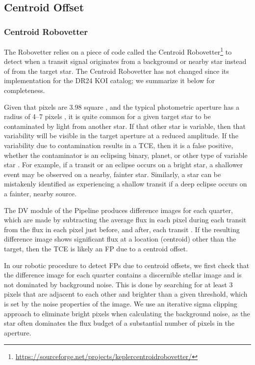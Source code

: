 \subsection{Centroid Offset}
\label{s:centroids}
\subsubsection{Centroid Robovetter}
\label{s:centroidrv}
The Robovetter relies on a piece of code called the Centroid Robovetter\footnote{\url{https://sourceforge.net/projects/keplercentroidrobovetter/}} \citep{Mullally2017} to detect when a transit signal originates from a background or nearby star instead of from the target star. The Centroid Robovetter has not changed since its implementation for the DR24 KOI catalog; we summarize it below for completeness. 

Given that  pixels are 3.98\arcsec{} square \citep{Koch2010}, and the typical photometric aperture has a radius of 4--7 pixels \citep{Bryson2010b}, it is quite common for a given target star to be contaminated by light from another star. If that other star is variable, then that variability will be visible in the target aperture at a reduced amplitude. If the variability due to contamination results in a TCE, then it is a false positive, whether the contaminator is an eclipsing binary, planet, or other type of variable star \citep{Bryson2013}. For example, if a transit or an eclipse occurs on a bright star, a shallower event may be observed on a nearby, fainter star. Similarly, a star can be mistakenly identified as experiencing a shallow transit if a deep eclipse occurs on a fainter, nearby source.

The DV module of the \kepler{} Pipeline produces difference images for each quarter, which are made by subtracting the average flux in each pixel during each transit from the flux in each pixel just before, and after, each transit \citep{Bryson2013}. If the resulting difference image shows significant flux at a location (centroid) other than the target, then the TCE is likely an FP due to a centroid offset.

In our robotic procedure to detect FPs due to centroid offsets, we first check that the difference image for each quarter contains a discernible stellar image and is not dominated by background noise. This is done by searching for at least 3 pixels that are adjacent to each other and brighter than a given threshold, which is set by the noise properties of the image. We use an iterative sigma clipping approach to eliminate bright pixels when calculating the background noise, as the star often dominates the flux budget of a substantial number of pixels in the aperture.


